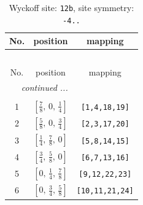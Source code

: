 \documentclass[fleqn,8pt]{jsarticle}
\begin{document}
\begin{longtable}{ccc}
\caption{Wyckoff site: {\tt 12b}, site symmetry: {\tt -4..}}
 \\
 \hline \hline
No. & position & mapping \\ \hline \endfirsthead

\multicolumn{2}{l}{\tablename\ \thetable{}} \\
 \hline \hline
No. & position & mapping \\ \hline \endhead

 \hline \hline
\multicolumn{2}{r}{\footnotesize\it continued ...} \\ \endfoot

 \hline \hline
\multicolumn{2}{r}{} \\ \endlastfoot

1 & $\left[ \frac{7}{8},\, 0,\, \frac{1}{4} \right]$ & {\tt [1,4,18,19]} \\ \hline
2 & $\left[ \frac{5}{8},\, 0,\, \frac{3}{4} \right]$ & {\tt [2,3,17,20]} \\ \hline
3 & $\left[ \frac{1}{4},\, \frac{7}{8},\, 0 \right]$ & {\tt [5,8,14,15]} \\ \hline
4 & $\left[ \frac{3}{4},\, \frac{5}{8},\, 0 \right]$ & {\tt [6,7,13,16]} \\ \hline
5 & $\left[ 0,\, \frac{1}{4},\, \frac{7}{8} \right]$ & {\tt [9,12,22,23]} \\ \hline
6 & $\left[ 0,\, \frac{3}{4},\, \frac{5}{8} \right]$ & {\tt [10,11,21,24]} \\
\end{longtable}
\renewcommand{\arraystretch}{1.2}
\end{document}
